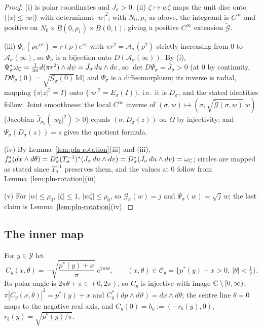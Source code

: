\begin{proof}
(i) is polar coordinates and $J_\sigma>0$. (ii) $\zeta\mapsto w\zeta$ maps the unit disc onto $\{|x|\le|w|\}$ with determinant $|w|^2$; with $N_0,\rho_1$ as above, the integrand is $C^\infty$ and positive on $N_0\times B(0,\rho_1)\times\bar B(0,1)$, giving a positive $C^\infty$ extension $\tilde{\mathcal G}$.

(iii) $\Psi_\sigma(\rho e^{i\psi})=r(\rho)e^{i\psi}$ with $\pi r^2=\mathcal A_\sigma(\rho^2)$ strictly increasing from $0$ to $\mathcal A_\sigma(\infty)$, so $\Psi_\sigma$ is a bijection onto $D(\mathcal A_\sigma(\infty))$. By (i), $\Psi_\sigma^*\omega_{\mathbb{C}}=\tfrac1{2\pi}d(\pi r^2)\wedge d\psi=\bar J_\sigma\,du\wedge dv$, so $\det D\Psi_\sigma=\bar J_\sigma>0$ (at $0$ by continuity, $D\Psi_\sigma(0)=\sqrt{\mathcal G_\sigma(0)}\,\mathrm{Id}$) and $\Psi_\sigma$ is a diffeomorphism; its inverse is radial, mapping $\{\pi|z|^2=I\}$ onto $\{|w|^2=E_\sigma(I)\}$, i.e.\ it is $D_\sigma$, and the stated identities follow. Joint smoothness: the local $C^\infty$ inverse of $(\sigma,w)\mapsto(\sigma,\sqrt{\tilde{\mathcal G}(\sigma,w)}\,w)$ (Jacobian $\bar J_{\sigma_0}(|w_0|^2)>0$) equals $(\sigma,D_\sigma(z))$ on $\Omega$ by injectivity; and $\Psi_\sigma(D_\sigma(z))=z$ gives the quotient formula.

(iv) By Lemma~\ref{lem:pln-rotation}(iii) and (iii), $f_\sigma^*(dx\wedge d\theta)=D_\sigma^*(T_\sigma^{-1})^*(J_\sigma\,du\wedge dv)=D_\sigma^*(\bar J_\sigma\,du\wedge dv)=\omega_{\mathbb{C}}$; circles are mapped as stated since $T_\sigma^{-1}$ preserves them, and the values at $0$ follow from Lemma~\ref{lem:pln-rotation}(iii).

(v) For $|w|\le\rho_0$, $|\zeta|\le1$, $|w\zeta|\le\rho_0$, so $\mathcal G_\sigma(w)=j$ and $\Psi_\sigma(w)=\sqrt j\,w$; the last claim is Lemma~\ref{lem:pln-rotation}(iv).
\end{proof}

\subsection{The inner map}\label{sec:pln-inner}

For $y\in\mathcal Y$ let
\begin{equation}\label{eq:pln-chart}
 C_y(x,\theta)=-\sqrt{\frac{p^*(y)+x}\pi}\;e^{2\pi i\theta},\qquad
 (x,\theta)\in\mathcal C_y=\{p^*(y)+x>0,\ |\theta|<\tfrac12\}.
\end{equation}
Its polar angle is $2\pi\theta+\pi\in(0,2\pi)$, so $C_y$ is injective with image $\mathbb{C}\setminus[0,\infty)$, $\pi|C_y(x,\theta)|^2=p^*(y)+x$ and $C_y^*(dp\wedge d\vartheta)=dx\wedge d\theta$; the centre line $\theta=0$ maps to the negative real axis, and $C_y(0)=b_y:=(-r_b(y),0)$, $r_b(y)=\sqrt{p^*(y)/\pi}$.

